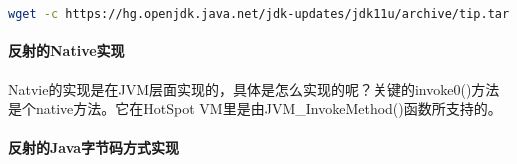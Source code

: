 \documentclass[../../../interview-questions.tex]{subfiles}
\begin{document}
\begin{lstlisting}[language=Bash]
wget -c https://hg.openjdk.java.net/jdk-updates/jdk11u/archive/tip.tar.gz    
\end{lstlisting}

\paragraph{反射的Native实现}

Natvie的实现是在JVM层面实现的，具体是怎么实现的呢？关键的invoke0()方法是个native方法。它在HotSpot VM里是由JVM\_InvokeMethod()函数所支持的。
\paragraph{反射的Java字节码方式实现}
\end{document}
